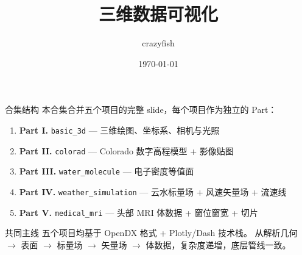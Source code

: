 \documentclass[aspectratio=169,11pt]{ctexbeamer}
\title{三维数据可视化}
\author{crazyfish}
\date{\today}
\begin{document}
\begin{frame}
  \titlepage
\end{frame}

\begin{frame}{合集结构}
  本合集合并五个项目的完整 slide，每个项目作为独立的 Part：

  \begin{enumerate}
    \item \textbf{Part I.} \texttt{basic\_3d} — 三维绘图、坐标系、相机与光照
    \item \textbf{Part II.} \texttt{colorad} — Colorado 数字高程模型 + 影像贴图
    \item \textbf{Part III.} \texttt{water\_molecule} — 电子密度等值面
    \item \textbf{Part IV.} \texttt{weather\_simulation} — 云水标量场 + 风速矢量场 + 流速线
    \item \textbf{Part V.} \texttt{medical\_mri} — 头部 MRI 体数据 + 窗位窗宽 + 切片
  \end{enumerate}

  \begin{block}{共同主线}
    五个项目均基于 OpenDX 格式 + Plotly/Dash 技术栈。
    从解析几何 $\to$ 表面 $\to$ 标量场 $\to$ 矢量场 $\to$ 体数据，复杂度递增，底层管线一致。
  \end{block}
\end{frame}
\end{document}

